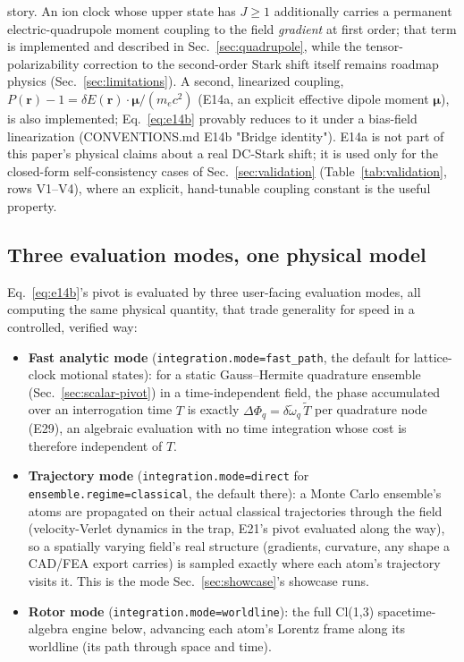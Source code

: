 \documentclass[aps,pra,superscriptaddress,groupedaddress,nofootinbib]{revtex4-2}
\begin{document}
story. An ion clock whose upper state has $J\ge1$ additionally carries
a permanent electric-quadrupole moment coupling to the field
\emph{gradient} at first order; that term is implemented and described
in Sec.~\ref{sec:quadrupole}, while the tensor-polarizability
correction to the second-order Stark shift itself remains roadmap
physics (Sec.~\ref{sec:limitations}). A second, linearized coupling,
$P(\mathbf{r})-1 = \delta E(\mathbf{r})\!\cdot\!\boldsymbol\mu / (m_ec^2)$
(E14a, an explicit effective dipole moment $\boldsymbol\mu$), is also
implemented; Eq.~\eqref{eq:e14b} provably reduces to it under a
bias-field linearization (CONVENTIONS.md E14b "Bridge identity"). E14a
is not part of this paper's physical claims about a real DC-Stark
shift; it is used only for the closed-form self-consistency cases of
Sec.~\ref{sec:validation} (Table~\ref{tab:validation}, rows V1--V4),
where an explicit, hand-tunable coupling constant is the useful property.

\subsection{Three evaluation modes, one physical model}
\label{sec:model-modes}
\label{sec:rotor-verification}

Eq.~\eqref{eq:e14b}'s pivot is evaluated by three user-facing evaluation
modes, all computing the same physical quantity, that trade generality for
speed in a controlled, verified way:

\begin{itemize}
\item \textbf{Fast analytic mode} (\texttt{integration.mode=fast\_path},
  the default for lattice-clock motional states): for a static
  Gauss--Hermite quadrature ensemble (Sec.~\ref{sec:scalar-pivot}) in a
  time-independent field, the
  phase accumulated over an interrogation time $T$ is exactly
  $\Delta\Phi_q = \delta\tilde\omega_q\,\tilde T$ per quadrature node
  (E29), an algebraic evaluation with no time integration whose cost is
  therefore independent of $T$.
\item \textbf{Trajectory mode} (\texttt{integration.mode=direct} for
  \texttt{ensemble.regime=classical}, the default there): a Monte Carlo
  ensemble's atoms are propagated on their actual classical trajectories
  through the field (velocity-Verlet dynamics in the trap, E21's pivot
  evaluated along the way), so a spatially varying field's real structure
  (gradients, curvature, any shape a CAD/FEA export carries) is
  sampled exactly where each atom's trajectory visits it. This is the
  mode Sec.~\ref{sec:showcase}'s showcase runs.
\item \textbf{Rotor mode} (\texttt{integration.mode=worldline}): the full
  Cl(1,3) spacetime-algebra engine below, advancing each atom's Lorentz
  frame along its worldline (its path through space and time).
\end{itemize}
\end{document}
